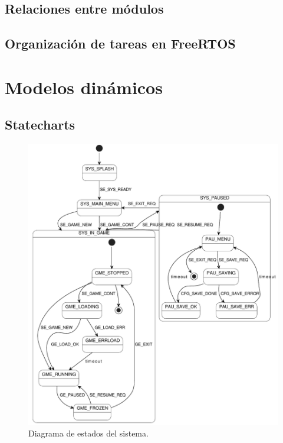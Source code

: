 \documentclass[11pt,a4paper]{article}
\begin{document}
\subsection{Relaciones entre módulos}
\subsection{Organización de tareas en FreeRTOS}

\section{Modelos dinámicos}
\subsection{Statecharts}
\begin{figure}[htb]
\centering 
\includegraphics[width=.85\textwidth]{../Figuras/statechart.pdf}
\caption{Diagrama de estados del sistema.}
\label{fig:diagEstados}
\end{figure}


\end{document}
